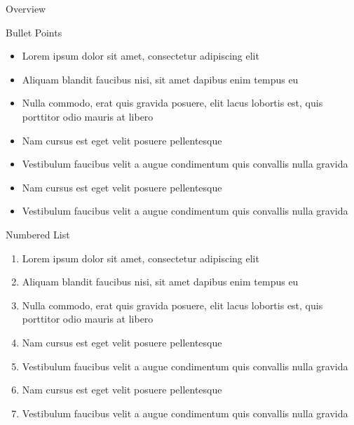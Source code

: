 \documentclass[aspectratio=169,xcolor=dvipsnames, t]{beamer}
\begin{document}
    \maketitlepage
    \begin{frame}[t]{Overview}
        \tableofcontents 
    \end{frame}

    \begin{frame}{Bullet Points}
        \begin{itemize}
            \item Lorem ipsum dolor sit amet, consectetur adipiscing elit
            \item Aliquam blandit faucibus nisi, sit amet dapibus enim tempus eu
            \item Nulla commodo, erat quis gravida posuere, elit lacus lobortis est, quis porttitor odio mauris at libero
            \item Nam cursus est eget velit posuere pellentesque
            \item Vestibulum faucibus velit a augue condimentum quis convallis nulla gravida
            \item Nam cursus est eget velit posuere pellentesque
            \item Vestibulum faucibus velit a augue condimentum quis convallis nulla gravida
        \end{itemize}
    \end{frame}

    \begin{frame}{Numbered List}
        \begin{enumerate}
            \item Lorem ipsum dolor sit amet, consectetur adipiscing elit
            \item Aliquam blandit faucibus nisi, sit amet dapibus enim tempus eu
            \item Nulla commodo, erat quis gravida posuere, elit lacus lobortis est, quis porttitor odio mauris at libero
            \item Nam cursus est eget velit posuere pellentesque
            \item Vestibulum faucibus velit a augue condimentum quis convallis nulla gravida
            \item Nam cursus est eget velit posuere pellentesque
            \item Vestibulum faucibus velit a augue condimentum quis convallis nulla gravida
        \end{enumerate}
    \end{frame}
\end{document}
